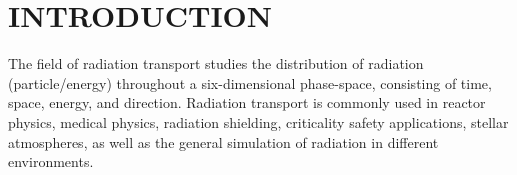 %
%
%
%



\pagestyle{plain} %
\setcounter{page}{1}


\chapter{\uppercase {INTRODUCTION}}\label{cha:introduction}

The field of radiation transport studies the distribution of radiation (particle/energy) throughout a six-dimensional phase-space, consisting of time, space, energy, and direction. 
Radiation transport is commonly used in reactor physics, medical physics, radiation shielding, criticality safety applications, stellar atmospheres, as well as the general simulation of radiation in different environments. 

